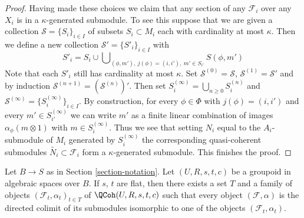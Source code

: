 \begin{proof}
\medskip\noindent
Having made these choices we claim that any section of any $\mathcal{F}_i$
over any $X_i$ is in a $\kappa$-generated submodule. To see this suppose
that we are given a collection $\mathcal{S} = \{S_i\}_{i \in I}$ of subsets
$S_i \subset M_i$ each with cardinality at most $\kappa$. Then we define
a new collection $\mathcal{S}' = \{S'_i\}_{i \in I}$ with
$$
S'_i = S_i \cup
\bigcup\nolimits_{(\phi, m'),\ j(\phi) = (i, i'),\ m' \in S_{i'}} S(\phi, m')
$$
Note that each $S'_i$ still has cardinality at most $\kappa$.
Set $\mathcal{S}^{(0)} = \mathcal{S}$,
$\mathcal{S}^{(1)} = \mathcal{S}'$ and by induction
$\mathcal{S}^{(n + 1)} = (\mathcal{S}^{(n)})'$. Then set
$S_i^{(\infty)} = \bigcup_{n \geq 0} S_i^{(n)}$ and
$\mathcal{S}^{(\infty)} = \{S_i^{(\infty)}\}_{i \in I}$.
By construction, for every $\phi \in \Phi$ with $j(\phi) = (i, i')$
and every $m' \in S^{(\infty)}_{i'}$ we can write $m'$
as a finite linear combination of images $\alpha_\phi(m \otimes 1)$
with $m \in S_i^{(\infty)}$. Thus we see that setting $N_i$ equal
to the $A_i$-submodule of $M_i$ generated by $S_i^{(\infty)}$
the corresponding quasi-coherent submodules
$\widetilde{N_i} \subset \mathcal{F}_i$ form a $\kappa$-generated submodule.
This finishes the proof.
\end{proof}

\begin{lemma}
\label{lemma-set-generators}
Let $B \to S$ as in Section \ref{section-notation}.
Let $(U, R, s, t, c)$ be a groupoid in algebraic spaces over $B$.
If $s$, $t$ are flat, then there exists a set $T$ and a family of objects
$(\mathcal{F}_t, \alpha_t)_{t \in T}$ of $\QCoh(U, R, s, t, c)$
such that every object $(\mathcal{F}, \alpha)$ is the directed colimit
of its submodules isomorphic to one of the objects $(\mathcal{F}_t, \alpha_t)$.
\end{lemma}

